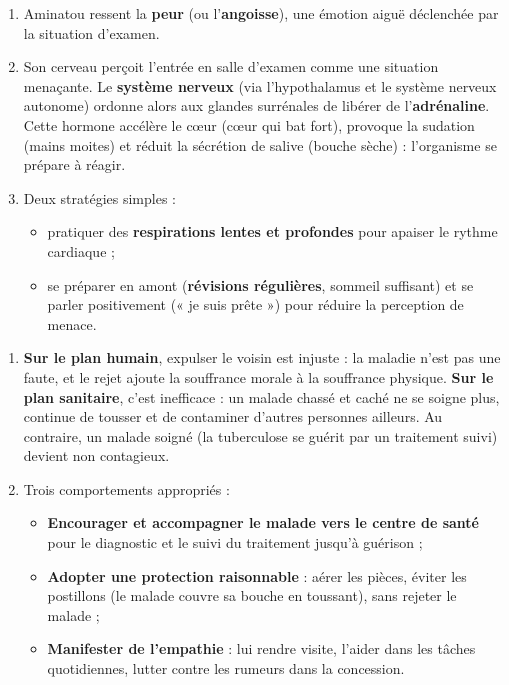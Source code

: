 \documentclass[11pt]{article}
\begin{document}
\begin{corrige}
\begin{enumerate}
\item Aminatou ressent la \textbf{peur} (ou l'\textbf{angoisse}), une émotion aiguë déclenchée par la situation d'examen.
\item Son cerveau perçoit l'entrée en salle d'examen comme une situation menaçante. Le \textbf{système nerveux} (via l'hypothalamus et le système nerveux autonome) ordonne alors aux glandes surrénales de libérer de l'\textbf{adrénaline}. Cette hormone accélère le cœur (cœur qui bat fort), provoque la sudation (mains moites) et réduit la sécrétion de salive (bouche sèche) : l'organisme se prépare à réagir.
\item Deux stratégies simples :
\begin{itemize}
\item pratiquer des \textbf{respirations lentes et profondes} pour apaiser le rythme cardiaque ;
\item se préparer en amont (\textbf{révisions régulières}, sommeil suffisant) et se parler positivement (« je suis prête ») pour réduire la perception de menace.
\end{itemize}
\end{enumerate}
\end{corrige}

\begin{corrige}
\begin{enumerate}
\item \textbf{Sur le plan humain}, expulser le voisin est injuste : la maladie n'est pas une faute, et le rejet ajoute la souffrance morale à la souffrance physique. \textbf{Sur le plan sanitaire}, c'est inefficace : un malade chassé et caché ne se soigne plus, continue de tousser et de contaminer d'autres personnes ailleurs. Au contraire, un malade soigné (la tuberculose se guérit par un traitement suivi) devient non contagieux.
\item Trois comportements appropriés :
\begin{itemize}
\item \textbf{Encourager et accompagner le malade vers le centre de santé} pour le diagnostic et le suivi du traitement jusqu'à guérison ;
\item \textbf{Adopter une protection raisonnable} : aérer les pièces, éviter les postillons (le malade couvre sa bouche en toussant), sans rejeter le malade ;
\item \textbf{Manifester de l'empathie} : lui rendre visite, l'aider dans les tâches quotidiennes, lutter contre les rumeurs dans la concession.
\end{itemize}
\end{enumerate}
\end{corrige}
\end{document}
